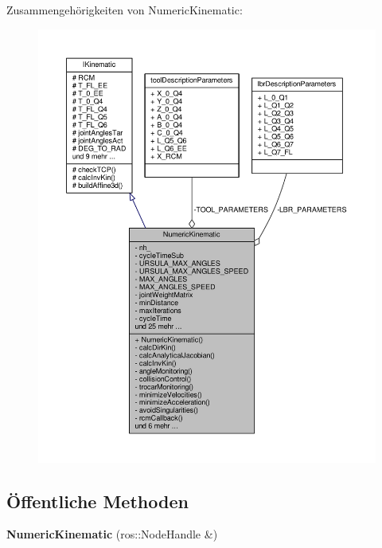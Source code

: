 Zusammengehörigkeiten von Numeric\-Kinematic\-:
\nopagebreak
\begin{figure}[H]
\begin{center}
\leavevmode
\includegraphics[width=350pt]{classNumericKinematic__coll__graph}
\end{center}
\end{figure}
\subsection*{Öffentliche Methoden}
\begin{DoxyCompactItemize}
\item 
\hypertarget{classNumericKinematic_aed713b319bef7e9bb52855d3b0c4b79c}{{\bfseries Numeric\-Kinematic} (ros\-::\-Node\-Handle \&)}\label{classNumericKinematic_aed713b319bef7e9bb52855d3b0c4b79c}

\end{DoxyCompactItemize}
